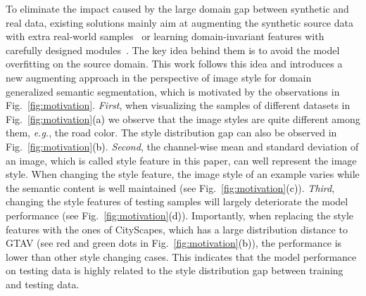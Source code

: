\documentclass{article}
\begin{document}
To eliminate the impact caused by the large domain gap between synthetic and real data, existing solutions mainly aim at augmenting the synthetic source data with extra real-world samples~\cite{DRPC,FSDR} or learning domain-invariant features with carefully designed modules~\cite{ibn,robustnet}. The key idea behind them is to avoid the model overfitting on the source domain. This work follows this idea and introduces a new augmenting approach in the perspective of image style for domain generalized semantic segmentation, which is motivated by the observations in Fig.~\ref{fig:motivation}. 
\textit{First}, when visualizing the samples of different datasets in Fig.~\ref{fig:motivation}\textcolor{black}{(a)} we observe that the image styles are quite different among them, \textit{e.g.}, the road color. The style distribution gap can also be observed in Fig.~\ref{fig:motivation}\textcolor{black}{(b)}.
\textit{Second}, the channel-wise mean and standard deviation of an image, which is called style feature in this paper, can well represent the image style. When changing the style feature, the image style of an example varies while the semantic content is well maintained (see Fig.~\ref{fig:motivation}\textcolor{black}{(c)}).
\textit{Third}, changing the style features of testing samples will largely deteriorate the model performance (see Fig.~\ref{fig:motivation}\textcolor{black}{(d)}). Importantly, when replacing the style features with the ones of CityScapes, which has a large distribution distance to GTAV (see red and green dots in Fig.~\ref{fig:motivation}\textcolor{black}{(b)}), the performance is lower than other style changing cases. This indicates that the model performance on testing data is highly related to the style distribution gap between training and testing data.
\end{document}
